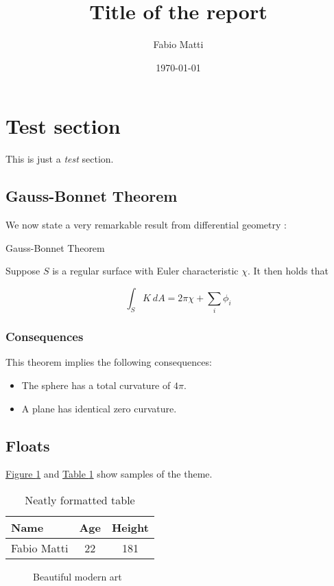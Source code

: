 \documentclass[11pt, a4paper]{article}
\title{Title of the report}
\author{Fabio Matti}
\date{\today}
\begin{document}
\maketitle

\section{Test section}
\label{sec:label}

This is just a \emph{test} section.

\subsection{Gauss-Bonnet Theorem}
\label{subsec:gauss-bonnet}

We now state a very remarkable result from differential
geometry \citep{article2021}:

\begin{block}{Gauss-Bonnet Theorem}

    Suppose $S$ is a regular surface with Euler characteristic $\chi$.
    It then holds that

    \begin{equation}
        \int_S K~dA = 2\pi\chi + \sum_i \phi_i
        \label{equ:gauss-bonnet}
    \end{equation}

\end{block}

\subsubsection{Consequences}
\label{subsubsec:gauss-bonnet}

This theorem implies the following consequences:

\begin{itemize}
    \item The sphere has a total curvature of $4\pi$.
    \item A plane has identical zero curvature.
\end{itemize}

\subsection{Floats}
\label{subsec:floats}

\hyperref[fig:test]{Figure \ref*{fig:test}} and \hyperref[tab:test]{Table \ref*{tab:test}}
show samples of the theme.

\begin{table}[h]
    \caption{Neatly formatted table}
    \label{tab:test}
    \centering
    \renewcommand{\arraystretch}{1.2}
    \begin{tabular}{@{}lcc@{}}
        \toprule
        Name & Age & Height \\
        \midrule
        Fabio Matti & 22 & 181 \\
        \bottomrule
    \end{tabular}
\end{table}

\begin{figure}[h]
    \centering
    \caption{Beautiful modern art}
    \label{fig:test}
\end{figure}


\end{document}
